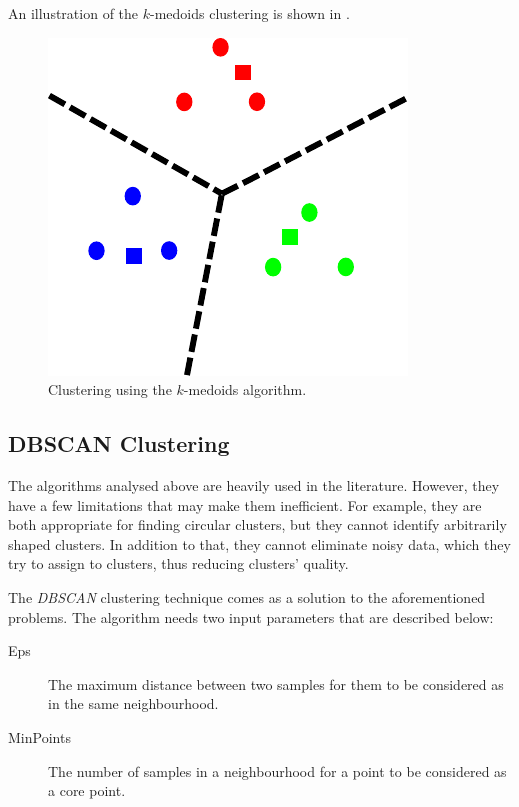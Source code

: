 An illustration of the $k$-medoids clustering is shown in .

\begin{figure}[ht]
  \centering
  \includegraphics[scale=0.5]{images/kmedoids.pdf}
  \caption[Clustering using the $k$-medoids algorithm]{Clustering using the $k$-medoids algorithm.}
  \label{images:kmedoids}
\end{figure}

\subsection{DBSCAN Clustering}
\label{subsec:DBSCAN}

The algorithms analysed above are heavily used in the literature. However, they have a few limitations that may make them inefficient. For example, they are both appropriate for finding circular clusters, but they cannot identify arbitrarily shaped clusters. In addition to that, they cannot eliminate noisy data, which they try to assign to clusters, thus reducing clusters' quality.

The \textit{DBSCAN} clustering technique comes as a solution to the aforementioned problems. The algorithm needs two input parameters that are described below:

\begin{description}
\item[Eps] The maximum distance between two samples for them to be considered as in the same neighbourhood.
\item[MinPoints] The number of samples in a neighbourhood for a point to be considered as a core point.
\end{description}
 
